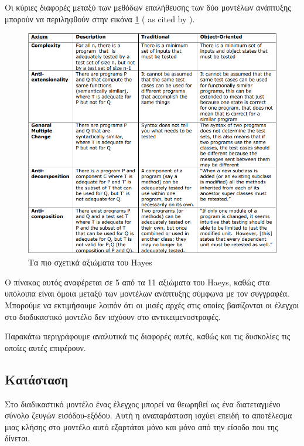 \documentclass[12pt]{article}
\begin{document}
Οι κύριες διαφορές μεταξύ των μεθόδων επαλήθευσης των δύο μοντέλων ανάπτυξης μπορούν να περιληφθούν στην εικόνα \ref{fig:hayes_table} (\textcite{hayes} as cited by \textcite{gordon}).

\begin{figure}
\label{fig:hayes_table}
\caption{Τα πιο σχετικά αξιώματα του Hayes}
\includegraphics[width=\textwidth,height=\textheight,keepaspectratio]{hayes_table.PNG}
\end{figure}

\par Ο πίνακας αυτός αναφέρεται σε 5 από τα 11 αξιώματα του Haeys, καθώς στα υπόλοιπα είναι όμοια μεταξύ των μοντέλων ανάπτυξης σύμφωνα με τον συγγραφέα. Μπορούμε να εκτιμήσουμε λοιπόν ότι οι μισές αρχές στις οποίες βασίζονται οι έλεγχοι στο διαδικαστικό μοντέλο δεν ισχύουν στο αντικειμενοστραφές.

\par Παρακάτω περιγράφουμε αναλυτικά τις διαφορές αυτές, καθώς και τις δυσκολίες τις οποίες αυτές επιφέρουν.

\subsection{Κατάσταση}

Στο διαδικαστικό μοντέλο ένας έλεγχος μπορεί να θεωρηθεί ως ένα διατεταγμένο σύνολο ζευγών εισόδου-εξόδου. Αυτή η αναπαράσταση ισχύει επειδή το αποτέλεσμα μιας κλήσης στο μοντέλο αυτό εξαρτάται μόνο και μόνο από την είσοδο που της δίνεται.
\end{document}
